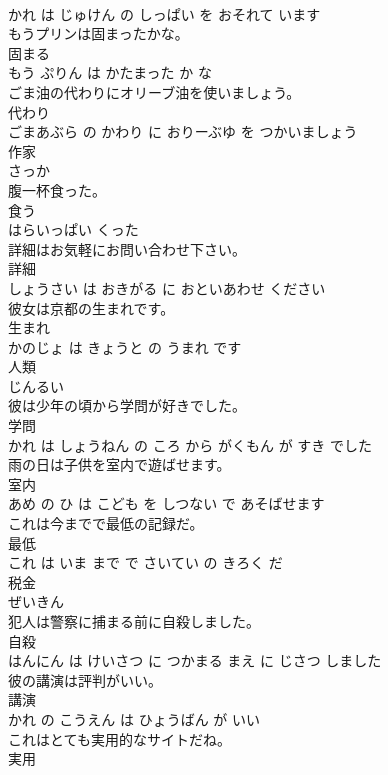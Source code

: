 \documentclass[8pt]{extreport}
\begin{document}
\begin{CJK}{UTF8}{min}
\\	かれ は じゅけん の しっぱい を おそれて います		
\\	もうプリンは固まったかな。	
\\	固まる 
\\	もう ぷりん は かたまった か な		
\\	ごま油の代わりにオリーブ油を使いましょう。	
\\	代わり 
\\	ごまあぶら の かわり に おりーぶゆ を つかいましょう		
\\	作家	
\\	さっか		
\\	腹一杯食った。	
\\	食う 
\\	はらいっぱい くった		
\\	詳細はお気軽にお問い合わせ下さい。	
\\	詳細 
\\	しょうさい は おきがる に おといあわせ ください		
\\	彼女は京都の生まれです。	
\\	生まれ 
\\	かのじょ は きょうと の うまれ です		
\\	人類	
\\	じんるい		
\\	彼は少年の頃から学問が好きでした。	
\\	学問 
\\	かれ は しょうねん の ころ から がくもん が すき でした		
\\	雨の日は子供を室内で遊ばせます。	
\\	室内 
\\	あめ の ひ は こども を しつない で あそばせます		
\\	これは今までで最低の記録だ。	
\\	最低 
\\	これ は いま まで で さいてい の きろく だ		
\\	税金	
\\	ぜいきん		
\\	犯人は警察に捕まる前に自殺しました。	
\\	自殺 
\\	はんにん は けいさつ に つかまる まえ に じさつ しました		
\\	彼の講演は評判がいい。	
\\	講演 
\\	かれ の こうえん は ひょうばん が いい		
\\	これはとても実用的なサイトだね。	
\\	実用 

\end{CJK}
\end{document}

